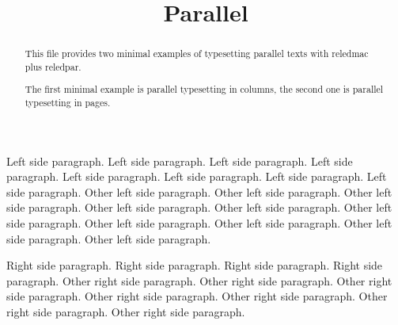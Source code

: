 \documentclass{article}
\begin{document}
\date{}
\title{Parallel}
\maketitle

\begin{abstract}
This file provides two minimal examples of typesetting parallel texts with reledmac plus reledpar.

The first minimal example is parallel typesetting in columns, the second one is parallel typesetting in pages.
\end{abstract}


\begin{pairs}
    \begin{Leftside}
        \beginnumbering
            \pstart
                Left side paragraph. Left side paragraph. Left side paragraph. Left side paragraph. Left side paragraph. Left side paragraph. Left side paragraph. Left side paragraph.
            \pend
            \pstart
                Other left side paragraph.  Other left side paragraph.  Other left side paragraph.  Other left side paragraph.  Other left side paragraph.  Other left side paragraph.  Other left side paragraph.  Other left side paragraph.  Other left side paragraph.  Other left side paragraph.
            \pend
        \endnumbering
    \end{Leftside}
    \begin{Rightside}
        \beginnumbering
            \pstart
                Right side paragraph. Right side paragraph. Right side paragraph. Right side paragraph.
            \pend
            \pstart
                Other right side paragraph. Other right side paragraph. Other right side paragraph. Other right side paragraph. Other right side paragraph. Other right side paragraph. Other right side paragraph.
            \pend
        \endnumbering
    \end{Rightside}

\end{pairs}
\Columns
\end{document}
